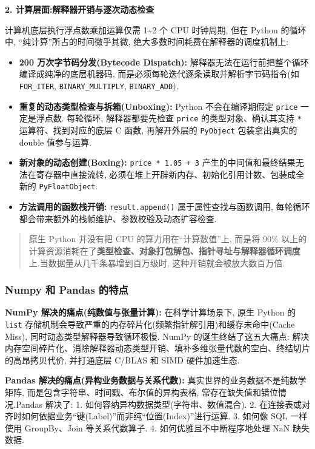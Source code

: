 \documentclass[11pt]{article}
\providecommand{\tightlist}{%
      \setlength{\itemsep}{0pt}\setlength{\parskip}{0pt}}
\begin{document}
\textbf{2. 计算层面:解释器开销与逐次动态检查}

计算机底层执行浮点数乘加运算仅需 1\textasciitilde2 个 CPU 时钟周期, 但在
Python 的循环中, ``纯计算''所占的时间微乎其微,
绝大多数时间耗费在解释器的调度机制上:

\begin{itemize}
\tightlist
\item
  \textbf{200 万次字节码分发(Bytecode Dispatch):}
  解释器无法在运行前把整个循环编译成纯净的底层机器码,
  而是必须每轮迭代逐条读取并解析字节码指令(如 \texttt{FOR\_ITER},
  \texttt{BINARY\_MULTIPLY}, \texttt{BINARY\_ADD}).
\item
  \textbf{重复的动态类型检查与拆箱(Unboxing):} Python 不会在编译期假定
  \texttt{price} 一定是浮点数. 每轮循环, 解释器都要先检查 \texttt{price}
  的类型对象、确认其支持 \texttt{*} 运算符、找到对应的底层 C 函数,
  再解开外层的 \texttt{PyObject} 包装拿出真实的 double 值参与运算.
\item
  \textbf{新对象的动态创建(Boxing):} \texttt{price\ *\ 1.05\ +\ 3}
  产生的中间值和最终结果无法在寄存器中直接流转,
  必须在堆上开辟新内存、初始化引用计数、包装成全新的
  \texttt{PyFloatObject}.
\item
  \textbf{方法调用的函数栈开销:} \texttt{result.append()}
  属于属性查找与函数调用,
  每轮循环都会带来额外的栈帧维护、参数校验及动态扩容检查.
\end{itemize}

\begin{quote}
原生 Python 并没有把 CPU 的算力用在``计算数值''上, 而是将 90\%
以上的计算资源消耗在了\textbf{类型检查、对象打包解包、指针寻址与解释器循环调度}上.当数据量从几千条暴增到百万级时,
这种开销就会被放大数百万倍.
\end{quote}

    \subsubsection{Numpy 和 Pandas
的特点}\label{numpy-ux548c-pandas-ux7684ux7279ux70b9}

    \textbf{NumPy 解决的痛点(纯数值与张量计算):} 在科学计算场景下, 原生
Python 的 \texttt{list}
存储机制会导致严重的内存碎片化(频繁指针解引用)和缓存未命中(Cache Miss),
同时动态类型解释器导致循环极慢. NumPy 的诞生终结了这五大痛点:
解决内存空间碎片化、消除解释器动态类型开销、填补多维张量代数的空白、终结切片的高昂拷贝代价,
并打通底层 C/BLAS 和 SIMD 硬件加速生态.

\textbf{Pandas 解决的痛点(异构业务数据与关系代数):}
真实世界的业务数据不是纯数学矩阵,
而是包含字符串、时间戳、布尔值的异构表格, 常存在缺失值和错位情况.Pandas
解决了: 1. 如何容纳异构数据类型(字符串、数值混合). 2.
在连接表或对齐时如何依据业务``键(Label)''而非纯``位置(Index)''进行运算.
3. 如何像 SQL 一样使用 GroupBy、Join 等关系代数算子. 4.
如何优雅且不中断程序地处理 NaN 缺失数据.
\end{document}
